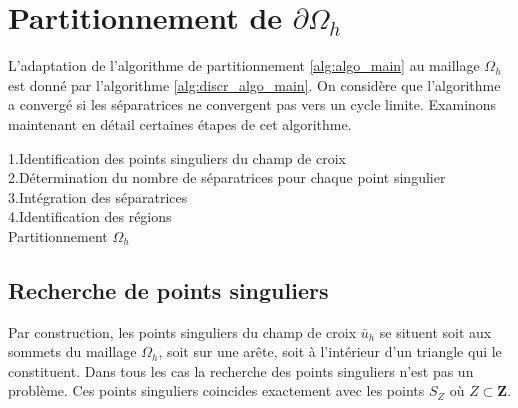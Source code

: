 \section{Partitionnement de $\partial\Omega_h$}
\label{sec:partitionnement_omega_h}

L'adaptation de l'algorithme de partitionnement \ref{alg:algo_main} au maillage $\Omega_h$ est donné par l'algorithme \ref{alg:discr_algo_main}. On considère que l'algorithme a convergé si les séparatrices ne convergent pas vers un cycle limite. Examinons maintenant en détail certaines étapes de cet algorithme.

\vspace{0.5cm}
\begin{algorithm}[h!]
\renewcommand{\algorithmcfname}{Algorithme}%
\SetAlgoLined
{}
\vspace{0.2cm}
1.\quad Identification des points singuliers du champ de croix\\[0.2cm]
2.\quad Détermination du nombre de séparatrices pour chaque point singulier\\[0.2cm]
3.\quad Intégration des séparatrices\\[0.2cm]
4.\quad Identification des régions\\[0.2cm]
\caption{Partitionnement $\Omega_h$}
\label{alg:discr_algo_main}
\end{algorithm}
\vspace{0.5cm}


\subsection{Recherche de points singuliers}

Par construction, les points singuliers du champ de croix $\bar{u}_h$ se situent soit aux sommets du maillage $\Omega_h$, soit sur une arête, soit à l'intérieur d'un triangle qui le constituent. Dans tous les cas la recherche des points singuliers n'est pas un problème. Ces points singuliers coincides exactement avec les points $S_Z$ où $Z\subset\mathbf{Z}$.

